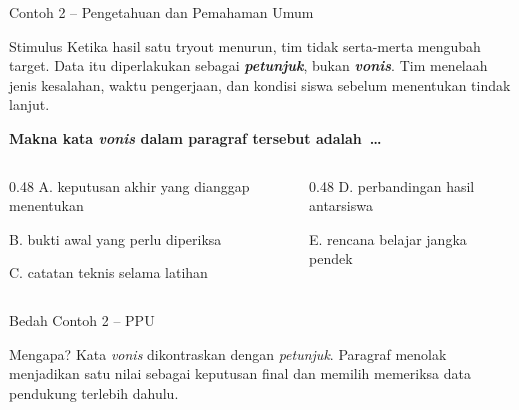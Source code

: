 \begin{frame}[shrink=6]{Contoh 2 -- Pengetahuan dan Pemahaman Umum}
  \begin{block}{Stimulus}
    Ketika hasil satu tryout menurun, tim tidak serta-merta mengubah target. Data itu diperlakukan sebagai \textbf{\emph{petunjuk}}, bukan \textbf{\emph{vonis}}. Tim menelaah jenis kesalahan, waktu pengerjaan, dan kondisi siswa sebelum menentukan tindak lanjut.
  \end{block}
  {\bfseries Makna kata \emph{vonis} dalam paragraf tersebut adalah~\ldots}
  \vspace{0.10cm}
  {\fontsize{10.1}{12.5}\selectfont
  \begin{columns}[T,onlytextwidth]
    \begin{column}{0.48\textwidth}
      A. keputusan akhir yang dianggap menentukan\par\vspace{0.08cm}
      B. bukti awal yang perlu diperiksa\par\vspace{0.08cm}
      C. catatan teknis selama latihan
    \end{column}
    \begin{column}{0.48\textwidth}
      D. perbandingan hasil antarsiswa\par\vspace{0.08cm}
      E. rencana belajar jangka pendek
    \end{column}
  \end{columns}}
\end{frame}

\begin{frame}{Bedah Contoh 2 -- PPU}
  \vspace{0.22cm}
  \begin{block}{Mengapa?}
    Kata \emph{vonis} dikontraskan dengan \emph{petunjuk}. Paragraf menolak menjadikan satu nilai sebagai keputusan final dan memilih memeriksa data pendukung terlebih dahulu.
  \end{block}
  {\fontsize{10.6}{13.2}\selectfont
  \par\vspace{0.16cm}
  }
\end{frame}

